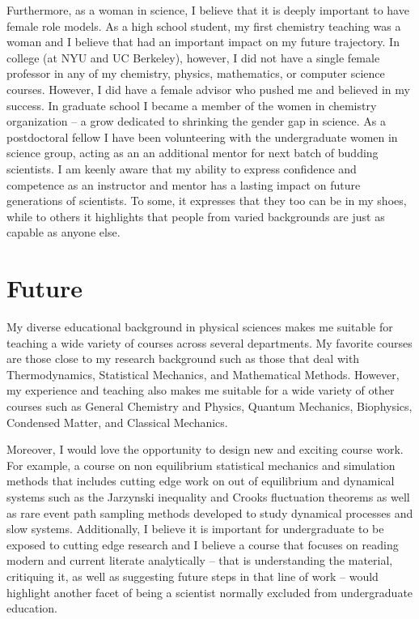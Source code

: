 \documentclass[11pt]{article}
\begin{document}
Furthermore, as a woman in science, I believe that it is deeply important to have female role models.  As a high school student, my first chemistry teaching was a woman and I believe that had an important impact on my future trajectory.  In college (at NYU and UC Berkeley), however, I did not have a single female professor in any of my chemistry, physics, mathematics, or computer science courses.  However, I did have a female advisor who pushed me and believed in my success.  In graduate school I became a member of the women in chemistry organization -- a grow dedicated to shrinking the gender gap in science.  As a postdoctoral fellow I have been volunteering with the undergraduate women in science group, acting as an an additional mentor for next batch of budding scientists.  I am keenly aware that my ability to express confidence and competence as an instructor and mentor has a lasting impact on future generations of scientists.  To some, it expresses that they too can be in my shoes, while to others it highlights that people from varied backgrounds are just as capable as anyone else.

\section{Future} %

My diverse educational background in physical sciences makes me suitable for teaching a wide variety of courses across several departments.  My favorite courses are those close to my research background such as those that deal with Thermodynamics, Statistical Mechanics, and Mathematical Methods.  However, my experience and teaching also makes me suitable for a wide variety of other courses such as General Chemistry and Physics, Quantum Mechanics, Biophysics, Condensed Matter, and Classical Mechanics.

Moreover, I would love the opportunity to design new and exciting course work.  For example, a course on non equilibrium statistical mechanics and simulation methods that includes cutting edge work on out of equilibrium and dynamical systems such as the Jarzynski inequality and Crooks fluctuation theorems as well as rare event path sampling methods developed to study dynamical processes and slow systems.  Additionally, I believe it is important for undergraduate to be exposed to cutting edge research and I believe a course that focuses on reading modern and current literate analytically -- that is understanding the material, critiquing it, as well as suggesting future steps in that line of work -- would highlight another facet of being a scientist normally excluded from undergraduate education.
\end{document}
